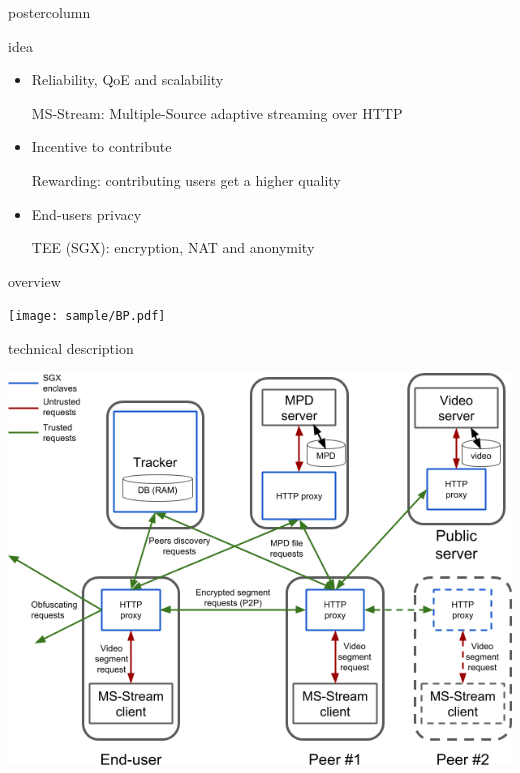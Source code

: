 \begin{frame}
\begin{columns}
\begin{column}{.49\textwidth}
\begin{beamercolorbox}[center,wd=\textwidth]{postercolumn}
\begin{minipage}[T]{.95\textwidth}
{            \begin{block}{\pname idea}
            
            \begin{itemize}
            
            \item Reliability, QoE and scalability
            
            MS-Stream: Multiple-Source adaptive streaming over HTTP
            
            \item Incentive to contribute
            
            Rewarding: contributing users get a higher quality
            
            \item End-users privacy
            
            TEE (SGX): encryption, NAT and anonymity
            
            \end{itemize}
            
            \end{block}
            
            \vfill
            
            \begin{block}{\pname overview}
            
            \centering
            
            \texttt{[image: sample/BP.pdf]}
            
            \end{block}
            
            \vfill
            
            \begin{block}{\pname technical description}
            
            \centering
            
            \includegraphics[width=.8\textwidth]{sample/PS-tech.png}
            

\end{block}}
\end{minipage}
\end{beamercolorbox}
\end{column}
\end{columns}
\end{frame}
